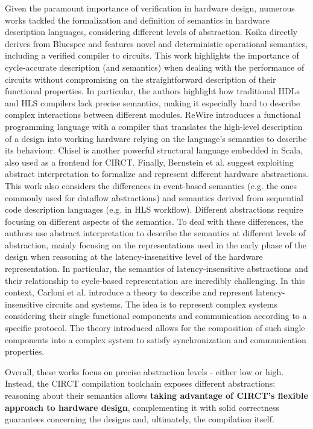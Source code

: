 \documentclass[acmtog]{acmart}
\begin{document}
Given the paramount importance of verification in hardware design, numerous works tackled the formalization and definition of 
semantics in hardware description languages, considering different levels of abstraction\cite{melham1988abstraction}. 
Koika\cite{bourgeat2020essence} directly derives from Bluespec\cite{bluespec} and features novel and deterministic operational semantics, 
including a verified compiler to circuits. This work highlights the importance of cycle-accurate description (and semantics) 
when dealing with the performance of circuits without compromising on the straightforward description of their functional properties. 
In particular, the authors highlight how traditional HDLs and HLS compilers lack precise semantics, making it especially hard to 
describe complex interactions between different modules.
ReWire\cite{procter2015semantics} introduces a functional programming language with a compiler that translates the high-level 
description of a design into working hardware relying on the language's semantics to describe its behaviour.
Chisel\cite{bachrach2012chisel} is another powerful structural language embedded in Scala, also used as a frontend for CIRCT. 
Finally, Bernstein et al. \cite{bernstein2021semantics} suggest exploiting abstract interpretation to formalize and represent 
different hardware abstractions. This work also considers the differences in event-based semantics (e.g. the ones commonly used for dataflow abstractions) 
and semantics derived from sequential code description languages (e.g. in HLS workflow). 
Different abstractions require focusing on different aspects of the semantics. 
To deal with these differences, the authors use abstract interpretation to describe the semantics at different levels of abstraction, 
mainly focusing on the representations used in the early phase of the design when reasoning at the latency-insensitive level of the hardware representation.
In particular, the semantics of latency-insensitive abstractions and their relationship to cycle-based representation are incredibly challenging. 
In this context, Carloni et al. \cite{carloni2001theory} introduce a theory to describe and represent latency-insensitive circuits and systems. 
The idea is to represent complex systems considering their single functional components and communication according to a specific protocol. 
The theory introduced allows for the composition of such single components into a complex system to satisfy synchronization and communication properties. 

Overall, these works focus on precise abstraction levels - either low or high. 
Instead, the CIRCT compilation toolchain exposes different abstractions: 
reasoning about their semantics allows \textbf{taking advantage of CIRCT’s flexible approach to hardware design}, complementing it with solid correctness 
guarantees concerning the designs and, ultimately, the compilation itself.
\end{document}
